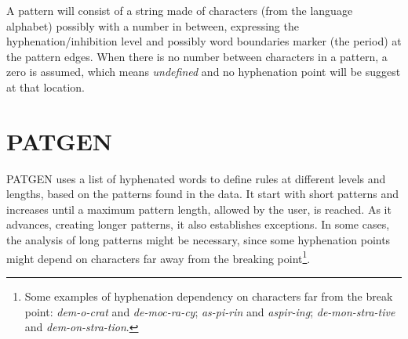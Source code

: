 \documentclass{article}
\begin{document}
A pattern will consist of a string made of characters (from the language
alphabet) possibly with a number in between, expressing the
hyphenation/inhibition level and possibly word boundaries marker (the period)
at the pattern edges. When there is no number between characters in a pattern,
a zero is assumed, which means \emph{undefined} and no hyphenation point will
be suggest at that location.



\section{PATGEN}
PATGEN uses a list of hyphenated words to define rules at different
levels and lengths, based on the patterns found in the data. It start with
short patterns and increases until a maximum pattern length, allowed by the
user, is reached. As it advances, creating longer patterns, it also establishes
exceptions. In some cases, the analysis of long patterns might be necessary,
since some hyphenation points might depend on characters far away from the
breaking point\footnote{Some examples of hyphenation dependency on characters
far from the break point: \emph{dem-o-crat} and \emph{de-moc-ra-cy};
\emph{as-pi-rin} and \emph{aspir-ing}; \emph{de-mon-stra-tive} and
\emph{dem-on-stra-tion}.}.
\end{document}
